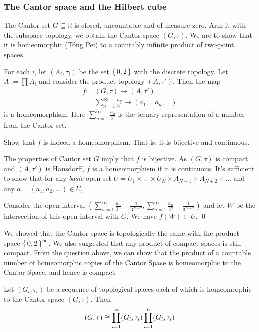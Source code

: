 \subsubsection{The Cantor space and the Hilbert cube}
The Cantor set $G \subseteq \mathbb R$ is closed, uncountable and of measure zero. 
Arm it with the subspace topology,
we obtain the Cantor space $(G,\tau)$.
We are to show that it is homeomorphic (Tóng Pēi) to a countably infinite product of two-point spaces.


For each $i$, let $(A_i, \tau_i)$ be the set $\set{0,2}$ with the discrete topology. Let $A := \prod A_i$ and
consider the product topology $(A,\tau')$.
Then the map 
\begin{align*}
  f \colon &(G,\tau) \to (A, \tau') \\
           &\sum_{n=1}^\infty \frac{a_n}{3^n} \mapsto (a_1,...a_n,...)
\end{align*}
is a homeomorphism.
Here $\sum_{n=1}^\infty \frac{a_n}{3^n}$ is the ternary representation of a number from the Cantor set.


\begin{qst}
  Show that $f$ is indeed a homeomorphism. That is, it is bijective and continuous.
\end{qst}

\begin{asw}
The properties of Cantor set $G$ imply that $f$ is bijective. As $(G, \tau)$ is compact and $(A, \tau')$ is Hausdorff, $f$ is a homeomorphism if it is continuous.
It's sufficient to show that for any \textit{basic} open set
$U = U_1 \times \dots \times U_N \times A_{N+1} \times A_{N+2} \times \dots$ and any
$a = (a_1,a_2,...) \in U$, 

Consider the open interval
$(\sum_{n=1}^\infty \frac{a_n}{3^n} - \frac{1}{3^{N+2}},  
\sum_{n=1}^\infty \frac{a_n}{3^n} + \frac{1}{3^{N+2}} )$
and let $W$ be the intersection of this open interval with $G$. We have $f(W) \subset U$. \qed
\end{asw}

We showed that the Cantor space is topologically the same with the product space $\set{0,2}^\infty$.
We also suggested that any product of compact spaces is still compact.
From the question above, 
we can show that the product of a countable number of homeomorphic copies of the Cantor Space is homeomorphic to the Cantor Space, and hence is compact.

\begin{prp}
  Let $(G_i, \tau_i)$ be a sequence of topological spaces
  each of which is homeomorphic to the Cantor space $(G,\tau)$. Then
  $$
  (G,\tau) \cong \prod_{i=1}^\infty (G_i, \tau_i) \prod_{i=1}^n (G_i, \tau_i)
  $$
\end{prp}





